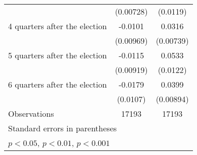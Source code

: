 \begin{table}[htbp]
\begin{tabular}{l*{2}{c}}
                    &   (0.00728)         &    (0.0119)         \\
[1em]
 4 quarters after the election&     -0.0101         &      0.0316\sym{***}\\
                    &   (0.00969)         &   (0.00739)         \\
[1em]
 5 quarters after the election&     -0.0115         &      0.0533\sym{***}\\
                    &   (0.00919)         &    (0.0122)         \\
[1em]
 6 quarters after the election&     -0.0179         &      0.0399\sym{***}\\
                    &    (0.0107)         &   (0.00894)         \\
\hline
Observations        &       17193         &       17193         \\
\hline\hline
\multicolumn{3}{l}{\footnotesize Standard errors in parentheses}\\
\multicolumn{3}{l}{\footnotesize \sym{*} \(p<0.05\), \sym{**} \(p<0.01\), \sym{***} \(p<0.001\)}\\
\end{tabular}
\end{table}
